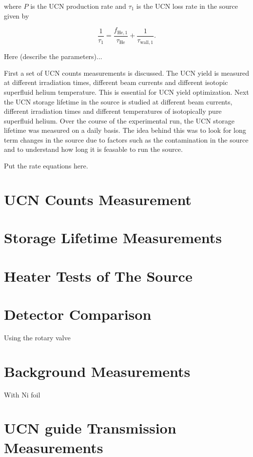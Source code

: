 where $P$ is the UCN production rate and $\tau_1$ is the UCN loss rate in the source given by

\begin{equation}
  \frac{1}{\tau_1} = \frac{ f_\mathrm{He,1}}{\tau_\mathrm{He}} + \frac{1}{\tau_\mathrm{wall,1}}.
\end{equation}

Here (describe the parameters)...

First a set of UCN counts measurements is discussed. The UCN yield is
measured at different irradiation times, different beam currents and
different isotopic superfluid helium temperature. This is essential
for UCN yield optimization.  Next the UCN storage lifetime in the
source is studied at different beam currents, different irradiation
times and different temperatures of isotopically pure superfluid
helium. Over the course of the experimental run, the UCN storage
lifetime was measured on a daily basis. The idea behind this was to
look for long term changes in the source due to factors such as the
contamination in the source and to understand how long it is feasable
to run the source.






Put the rate equations here.
\section{UCN Counts Measurement}



\section{Storage Lifetime Measurements}

\section{Heater Tests of The Source}

\section{Detector Comparison}
Using the rotary valve

\section{Background Measurements}
With Ni foil

\section{UCN guide Transmission Measurements}

